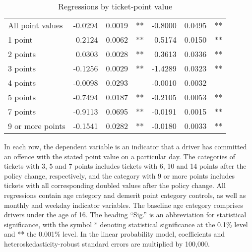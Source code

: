 \begin{table}
\begin{tabular}{l r r l r r l}
All point values                &  -0.0294        &  0.0019       &   **       &  -0.8000        &  0.0495       &   **       \\ 
1 point                         &  0.2124        &  0.0062       &   **       &  0.5174        &  0.0150       &   **       \\ 
2 points                        &  0.0303        &  0.0028       &   **       &  0.3613        &  0.0336       &   **       \\ 
3 points                        &  -0.1256        &  0.0029       &   **       &  -1.4289        &  0.0323       &   **       \\ 
4 points                        &  -0.0098        &  0.0293       &            &  -0.0010        &  0.0032       &            \\ 
5 points                        &  -0.7494        &  0.0187       &   **       &  -0.2105        &  0.0053       &   **       \\ 
7 points                        &  -0.9113        &  0.0695       &   **       &  -0.0191        &  0.0015       &   **       \\ 
9 or more points                &  -0.1541        &  0.0282       &   **       &  -0.0180        &  0.0033       &   **       \\ 

\hline 

\end{tabular} 
\caption{Regressions by ticket-point value} 
In each row, the dependent variable is an indicator that a driver has committed  
an offence with the stated point value on a particular day.  
The categories of tickets with 3, 5 and 7 points includes tickets  
with 6, 10 and 14 points after the policy change, respectively,  
and the category with 9 or more points includes tickets  
with all corresponding doubled values after the policy change. 
All regressions contain age category and demerit point category controls, 
as well as monthly and weekday indicator variables. 
The baseline age category comprises drivers under the age of 16. 
The heading ``Sig.'' is an abbreviation for statistical significance, with 
the symbol * denoting statistical significance at the 0.1\% level 
and ** the 0.001\% level. 
In the linear probability model, coefficients and heteroskedasticity-robust standard errors are  
multiplied by 100,000.  
\label{tab:seas_Logit_vs_LPMx100K_regs_by_points} 
\end{table} 
 
